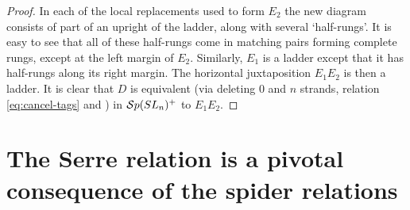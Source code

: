 \documentclass[10pt,leqno]{article}
\begin{document}
\begin{proof}

In each of the local replacements used to form $E_2$ the new diagram consists of part of an upright of the ladder, along with several `half-rungs'. It is easy to see that all of these half-rungs come in matching pairs forming complete rungs, except at the left margin of $E_2$. Similarly, $E_1$ is a ladder except that it has half-rungs along its right margin. The horizontal juxtaposition $E_1 E_2$ is then a ladder.
It is clear that $D$ is equivalent (via deleting $0$ and $n$ strands, relation \ref{eq:cancel-tags} and ) in ${\mathcal{S}p}(SL_n)^+$ to $E_1 E_2$.
\end{proof}

\appendix

\section{The Serre relation is a pivotal consequence of the spider relations}
\label{sec:serre}
\end{document}
